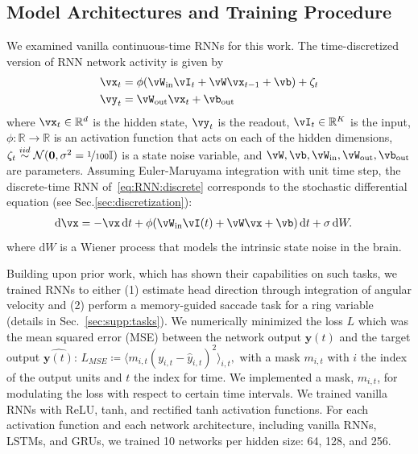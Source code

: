 \documentclass{article} %
\newcounter{ct}
\newcommand{\dm}[1]{\ensuremath{\mathrm{d}{#1}}} %
\newcommand{\win}{\vW_{\text{in}}}
\newcommand{\wout}{\vW_{\text{out}}}
\newcommand{\bout}{\vb_{\text{out}}}
\newcommand{\reals}{\mathbb{R}}
\newcommand{\iidsample}{\stackrel{iid}{\sim}}
\newcommand{\identity}{\ensuremath{\mathbb{I}}}
\theoremstyle{definition}
\theoremstyle{remark}
\begin{document}
\subsection{Model Architectures and Training Procedure}
We examined vanilla continuous-time RNNs for this work.
The time-discretized version of RNN network activity is given by
\begin{equation}
  \begin{aligned}
	\vx_{t} &= \phi(\win \vI_{t} + \vW \vx_{t - 1} + \vb) + \zeta_{t} \label{eq:RNN:discrete}\\
	\vy_{t} &= \wout \vx_{t} + \bout
  \end{aligned}
\end{equation}where \(\vx_{t} \in \reals^{d}\) is the hidden state,
\(\vy_{t} \) is the readout,
\(\vI_{t} \in \reals^{K}\) is the input,
\(\phi\colon \reals \to \reals\) is an activation function that acts on each of the hidden dimensions,
 \(\zeta_{t}\iidsample\mathcal{N}(\mathbf{0},\sigma^{2} = \nicefrac{1}{100}\identity)\) is a state noise variable, and %
\(\vW, \vb, \win, \wout, \bout\) are parameters.
Assuming Euler-Maruyama integration with unit time step, the discrete-time RNN of~\eqref{eq:RNN:discrete} corresponds to the stochastic differential equation (see Sec.\ref{sec:discretization}):
\begin{align}
    \dm{\vx} &= -\vx\,\dm{t} + \phi(\win \vI(t) + \vW \vx + \vb)\,\dm{t} + \sigma\,\dm{W}. \label{eq:RNN:continuous}
\end{align}where \(\dm{W}\) is a Wiener process that models the intrinsic state noise in the brain.

Building upon prior work, which has shown their capabilities on such tasks, we trained RNNs to either
(1) estimate head direction through integration of angular velocity \citep{cueva2019headdirection,cueva2021continuous}
and (2) perform a memory-guided saccade task for a ring variable \citep{wimmer2014} (details in Sec.~\ref{sec:supp:tasks}).
We numerically minimized the loss \(L\) which was the mean squared error (MSE) between the network output \(\mathbf{y}(t)\) and the target output \(\hat{\mathbf{y}(t)}\):
\(L_{MSE} \coloneqq \langle m_{i, t}(y_{i, t}-\hat y_{i, t})^{2}\rangle_{i, t}, \)
with a mask \(m_{i, t}\) with \(i\) the index of the output units and \(t\)  the index for time.
We implemented a mask, \(m_{i, t}\), for modulating the loss with respect to certain time intervals.
We trained vanilla RNNs with ReLU, tanh, and rectified tanh activation functions. For each activation function and each network architecture, including vanilla RNNs, LSTMs, and GRUs, we trained 10 networks per hidden size: 64, 128, and 256.
\end{document}
